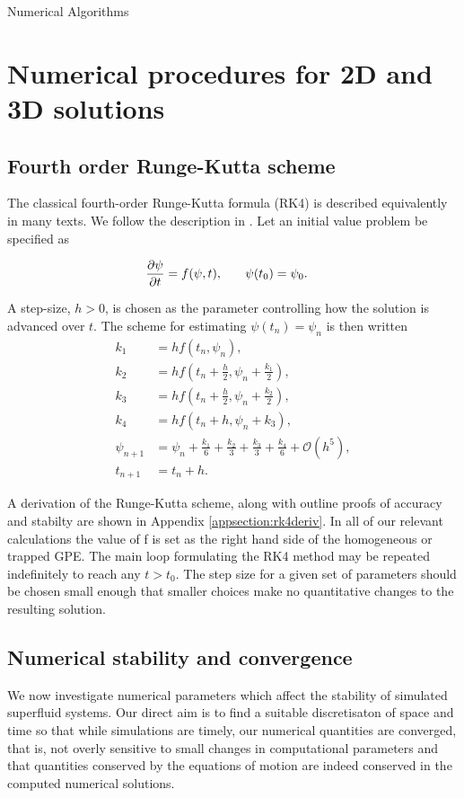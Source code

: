 \begin{chapter}{\label{cha:numerics}Numerical Algorithms}
\section{\label{section:RK} Numerical procedures for 2D and 3D solutions}
	\subsection{\label{section:RK4} Fourth order Runge-Kutta scheme}
	The classical fourth-order Runge-Kutta formula (RK4) is described equivalently in many texts. We follow the description in \cite{NumericalRecipes}. Let an initial value problem be specified as
	
	\begin{align*}
		\frac{\partial \psi}{\partial t} &= f(\psi,t),\hspace{0.25in}\psi(t_0) = \psi_0.
	\end{align*}

A step-size, $h>0$, is chosen as the parameter controlling how the solution is advanced over $t$. The scheme for estimating $\psi(t_n)= \psi_n$ is then written
\begin{equation}
\begin{split}
		k_1 &= hf(t_n,\psi_n),\\
		k_2 &= hf(t_n+\frac{h}{2},\psi_n+\frac{k_1}{2}),\\
		k_3 &= hf(t_n+\frac{h}{2},\psi_n+\frac{k_2}{2}),\\
		k_4 &= hf(t_n+h,\psi_n+k_3),\\
		\psi_{n+1} &= \psi_n + \frac{k_1}{6}+ \frac{k_2}{3}+ \frac{k_3}{3} + \frac{k_4}{6} + \mathcal{O}(h^5),\\
		t_{n+1}  &= t_n + h.
		\label{eq:rk4}
\end{split}
\end{equation}


	A derivation of the Runge-Kutta scheme, along with outline proofs of accuracy and stabilty are shown in Appendix \ref{appsection:rk4deriv}.
	In all of our relevant calculations the value of f is set as the right hand side of the homogeneous or trapped GPE. The main loop formulating the RK4 method may be repeated indefinitely to reach any $t>t_0$. The step size for a given set of parameters should be chosen small enough that smaller choices make no quantitative changes to the resulting solution.

	\subsection{\label{section:numericalParams} Numerical stability and convergence}
	We now investigate numerical parameters which affect the stability of simulated superfluid systems. Our direct aim is to find a suitable discretisaton of space and time so that while simulations are timely, our numerical quantities are converged, that is, not overly sensitive to small changes in computational parameters and that quantities conserved by the equations of motion are indeed conserved in the computed numerical solutions.


\end{chapter}
